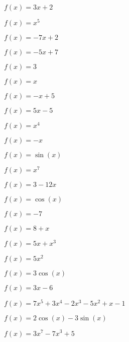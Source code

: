 \documentclass[11pt]{article}
\begin{document}
\begin{exercice}[1][Consigne]
  \begin{multicols}{3}
    \begin{enu}
    \item $f(x) = 3x + 2$
    \item $f(x) = x^5$
    \item $f(x) = -7x + 2$
    \item $f(x) = -5x + 7$
    \item $f(x) = 3$
    \item $f(x) = x$
    \item $f(x) = - x + 5$
    \item $f(x) = 5x - 5$
    \item $f(x) = x^4$
    \item $f(x) = - x$
    \item $f(x) = \sin(x)$
    \item $f(x) = x^7$
    \item $f(x) = 3 - 12x$
    \item $f(x) = \cos(x)$
    \item $f(x) = -7$
    \item $f(x) = 8 + x$
    \end{enu}
  \end{multicols}
\end{exercice}

\begin{exercice}[1][Consigne]
  \begin{multicols}{3}
    \begin{enu}
    \item $f(x) = 5x + x^3$
    \item $f(x) = 5x^2$
    \item $f(x) = 3 \cos(x)$
    \item $f(x) = 3x-6$
    \item $f(x) = 7x^5 + 3x^4-2x^3-5x^2 + x-1$
    \item $f(x) = 2 \cos(x)-3 \sin(x)$
    \item $f(x) = 3x^7-7x^3 + 5$
    \end{enu}
  \end{multicols}
\end{exercice}
\end{document}
